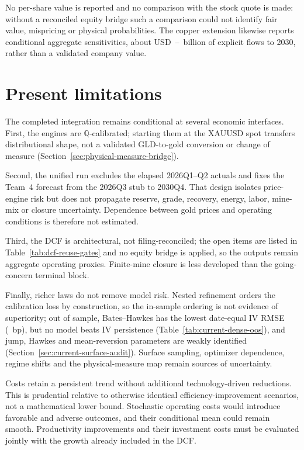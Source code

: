No per-share value is reported and no comparison with the stock quote is made: without a reconciled equity bridge such a comparison could not identify fair value, mispricing or physical probabilities. The copper extension likewise reports conditional aggregate sensitivities, about USD~\CuDeltaLow--\CuDeltaHigh~billion of explicit flows to 2030, rather than a validated company value.

\section*{Present limitations}

The completed integration remains conditional at several economic interfaces.
First, the engines are \(\mathbb Q\)-calibrated; starting them at the XAUUSD
spot transfers distributional shape, not a validated GLD-to-gold conversion
or change of measure (Section~\ref{sec:physical-measure-bridge}).

Second, the unified run excludes the elapsed 2026Q1--Q2 actuals and fixes the
Team~4 forecast from the 2026Q3 stub to 2030Q4. That design isolates price-engine risk but does not propagate reserve,
grade, recovery, energy, labor, mine-mix or closure uncertainty. Dependence
between gold prices and operating conditions is therefore not estimated.

Third, the DCF is architectural, not filing-reconciled; the open items are
listed in Table~\ref{tab:dcf-reuse-gates} and no equity bridge is applied, so
the outputs remain aggregate operating proxies. Finite-mine closure is less
developed than the going-concern terminal block.

Finally, richer laws do not remove model risk. Nested refinement orders the
calibration loss by construction, so the in-sample ordering is not evidence of
superiority; out of sample, Bates--Hawkes has the lowest date-equal IV
RMSE (\OosWRMSE~bp), but no model beats IV persistence
(Table~\ref{tab:current-dense-oos}), and jump, Hawkes and mean-reversion
parameters are weakly identified (Section~\ref{sec:current-surface-audit}).
Surface sampling, optimizer dependence, regime shifts and the physical-measure
map remain sources of uncertainty.

Costs retain a persistent trend without additional technology-driven reductions.
This is prudential relative to otherwise identical efficiency-improvement
scenarios, not a mathematical lower bound. Stochastic operating costs would
introduce favorable and adverse outcomes, and their conditional mean could
remain smooth. Productivity improvements and their investment costs must be
evaluated jointly with the growth already included in the DCF.

